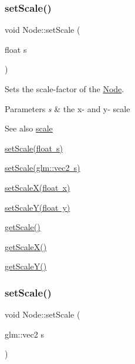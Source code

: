 \subsubsection{\texorpdfstring{setScale()}{setScale()}\hspace{0.1cm}{\footnotesize\ttfamily [1/2]}}
{\footnotesize\ttfamily void Node\+::set\+Scale (\begin{DoxyParamCaption}\item[{float}]{s }\end{DoxyParamCaption})}



Sets the scale-\/factor of the \mbox{\hyperlink{classsage_1_1Node}{Node}}. 


\begin{DoxyParams}{Parameters}
{\em s} & the x-\/ and y-\/ scale \\
\hline
\end{DoxyParams}
\begin{DoxySeeAlso}{See also}
\mbox{\hyperlink{classsage_1_1Node_a3014b585d97d3a449e83bc0252db0c50}{scale}} 

\mbox{\hyperlink{classsage_1_1Node_a939698b2eb68ee5b60b91e2426e95369}{set\+Scale(float s)}} 

\mbox{\hyperlink{classsage_1_1Node_aecff30b003ce1c2266cc60a34b72559d}{set\+Scale(glm\+::vec2 s)}} 

\mbox{\hyperlink{classsage_1_1Node_ab8126397f90ccdee0755b984b26809d8}{set\+Scale\+X(float x)}} 

\mbox{\hyperlink{classsage_1_1Node_afa22161545d63e9e011f8eeb5acdead7}{set\+Scale\+Y(float y)}} 

\mbox{\hyperlink{classsage_1_1Node_af1a9bc0715acbc80623b5a15a5f65f3f}{get\+Scale()}} 

\mbox{\hyperlink{classsage_1_1Node_a27040ef8ab59ccf42b87d6ddc8d794e6}{get\+Scale\+X()}} 

\mbox{\hyperlink{classsage_1_1Node_ab87661ab8940512baf2e7639ea55ff87}{get\+Scale\+Y()}} 
\end{DoxySeeAlso}
\mbox{\label{classsage_1_1Node_aecff30b003ce1c2266cc60a34b72559d}} 
\subsubsection{\texorpdfstring{setScale()}{setScale()}\hspace{0.1cm}{\footnotesize\ttfamily [2/2]}}
{\footnotesize\ttfamily void Node\+::set\+Scale (\begin{DoxyParamCaption}\item[{glm\+::vec2}]{s }\end{DoxyParamCaption})}



